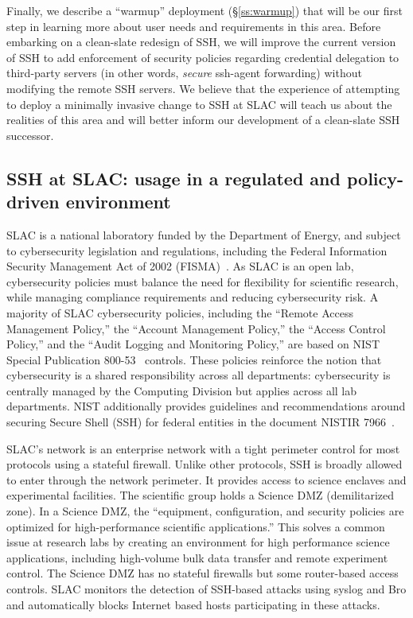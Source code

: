 \documentclass[10pt]{article}
\begin{document}
Finally, we describe a ``warmup'' deployment (\S\ref{ss:warmup}) that
will be our first step in learning more about user needs and
requirements in this area. Before embarking on a clean-slate redesign
of SSH, we will improve the current version of SSH to add
enforcement of security policies regarding credential delegation to
third-party servers (in other words, \emph{secure} ssh-agent
forwarding) without modifying the remote SSH servers. We believe that
the experience of attempting to deploy a minimally invasive change to
SSH at SLAC will teach us about the realities of this area and will
better inform our development of a clean-slate SSH successor.

\subsection{SSH at SLAC: usage in a regulated and policy-driven environment}
\label{ss:sshatslac}
SLAC is a national laboratory funded by the Department of Energy, and
subject to cybersecurity legislation and regulations, including the
Federal Information Security Management Act of 2002
(FISMA)~\cite{fisma}. As SLAC is an open lab, cybersecurity policies
must balance the need for flexibility for scientific research, while
managing compliance requirements and reducing cybersecurity risk. A
majority of SLAC cybersecurity policies, including the ``Remote Access
Management Policy,'' the ``Account Management Policy,'' the ``Access
Control Policy,'' and the ``Audit Logging and Monitoring Policy,'' are
based on NIST Special Publication 800-53~\cite{nist80053}
controls. These policies reinforce the notion that cybersecurity is a
shared responsibility across all departments: cybersecurity is
centrally managed by the Computing Division but applies across all lab
departments. NIST additionally provides guidelines and recommendations
around securing Secure Shell (SSH) for federal entities in the
document NISTIR 7966~\cite{nistSSH}.

SLAC's network is an enterprise network with a tight perimeter control
for most protocols using a stateful firewall. Unlike other protocols,
SSH is broadly allowed to enter through the network perimeter. It
provides access to science enclaves and experimental facilities. The
scientific group holds a Science DMZ (demilitarized zone). In a
Science DMZ, the ``equipment, configuration, and security policies are
optimized for high-performance scientific applications.'' This solves
a common issue at research labs by creating an environment for high
performance science applications, including high-volume bulk data
transfer and remote experiment control. The Science DMZ has no
stateful firewalls but some router-based access controls. SLAC
monitors the detection of SSH-based attacks using syslog and Bro and
automatically blocks Internet based hosts participating in these
attacks.
\end{document}
